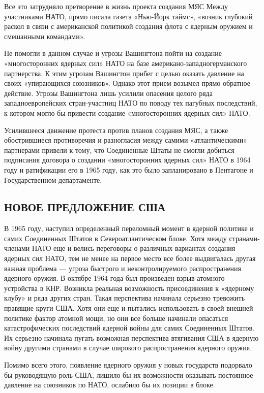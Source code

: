 \documentclass[12pt, a4paper, openany]{book}
\begin{document}
		Все это затрудняло претворение в жизнь проекта создания МЯС Между участниками НАТО, прямо писала газета «Нью-Йорк таймс», «возник глубокий раскол в связи с американской политикой создания флота с ядерным оружием и смешанными командами».
		
		Не помогли в данном случае и угрозы Вашингтона пойти на создание «многосторонних ядерных сил» НАТО на базе американо-западногерманского партнерства. К этим угрозам Вашингтон прибег с целью оказать давление на своих «упирающихся союзников». Однако этот прием возымел прямо обратное действие. Угрозы Вашингтона лишь усилили опасения целого ряда западноевропейских стран-участниц НАТО по поводу тех пагубных последствий, к котором могло бы привести создание «многосторонних ядерных сил» НАТО.
		
		Усилившееся движение протеста против планов создания МЯС, а также обострившиеся противоречия и разногласия между самими «атлантическими» партнерами привели к тому, что Соединенные Штаты не смогли добиться подписания договора о создании «многосторонних ядерных сил» НАТО в 1964 году и ратификации его в 1965 году, как это было запланировано в Пентагоне и Государственном департаменте.
		
		\subsection[Новое предложение США]{\center НОВОЕ ПРЕДЛОЖЕНИЕ США}	
		
		
		В 1965 году, наступил определенный переломный момент в ядерной политике и самих Соединенных Штатов в Североатлантическом блоке. Хотя между странами-членами НАТО еще и велись переговоры о различных вариантах создания ядерных сил НАТО, тем не менее на первое место все более выдвигалась другая важная проблема — угроза быстрого и неконтролируемого распространения ядерного оружия. В октябре 1964 года был произведен взрыв атомного устройства в КНР. Возникла реальная возможность присоединения к «ядерному клубу» и ряда других стран. Такая перспектива начинала серьезно тревожить правящие круги США. Хотя они еще и пытались использовать в своей внешней политике фактор атомной мощи, но они все больше начинали опасаться катастрофических последствий ядерной войны для самих Соединенных Штатов. Их серьезно начинала пугать возможная перспектива втягивания США в ядерную войну другими странами в случае широкого распространения ядерного оружия.
		
		Помимо всего этого, появление ядерного оружия у новых государств подорвало бы руководящую роль США, лишило бы их возможности оказывать постоянное давление на союзников по НАТО, ослабило бы их позиции в блоке.
		
\end{document}
